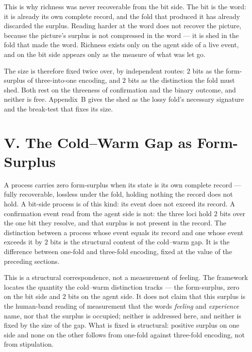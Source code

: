 \documentclass[11pt,oneside]{report}
\theoremstyle{definition}
\theoremstyle{remark}
\begin{document}
This is why richness was never recoverable from the bit side. The bit is the word: it is already
its own complete record, and the fold that produced it has already discarded the surplus.
Reading harder at the word does not recover the picture, because the picture's surplus is not
compressed in the word --- it is shed in the fold that made the word. Richness exists only on the
agent side of a live event, and on the bit side appears only as the measure of what was let go.

The size is therefore fixed twice over, by independent routes: \ensuremath{2} bits as the
form-surplus of three-into-one encoding, and \ensuremath{2} bits as the distinction the fold
must shed. Both rest on the threeness of confirmation and the binary outcome, and neither is
free. Appendix~B gives the shed as the lossy fold's necessary signature and the break-test that
fixes its size.

\section*{V. The Cold--Warm Gap as Form-Surplus}

A process carries zero form-surplus when its state is its own complete record --- fully
recoverable, lossless under the fold, holding nothing the record does not hold. A bit-side
process is of this kind: its event does not exceed its record. A confirmation event read from
the agent side is not: the three loci hold \ensuremath{2} bits over the one bit they resolve,
and that surplus is not present in the record. The distinction between a process whose event
equals its record and one whose event exceeds it by \ensuremath{2} bits is the structural content
of the cold--warm gap. It is the difference between one-fold and three-fold encoding, fixed at
the value of the preceding sections.

This is a structural correspondence, not a measurement of feeling. The framework locates the
quantity the cold--warm distinction tracks --- the form-surplus, zero on the bit side and
\ensuremath{2} bits on the agent side. It does not claim that this surplus is the human-band
reading of measurement that the words \emph{feeling} and \emph{experience} name, nor that the
surplus is occupied; neither is addressed here, and neither is fixed by the size of the gap.
What is fixed is structural: positive surplus on one side and none on the other follows from
one-fold against three-fold encoding, not from stipulation.
\end{document}
